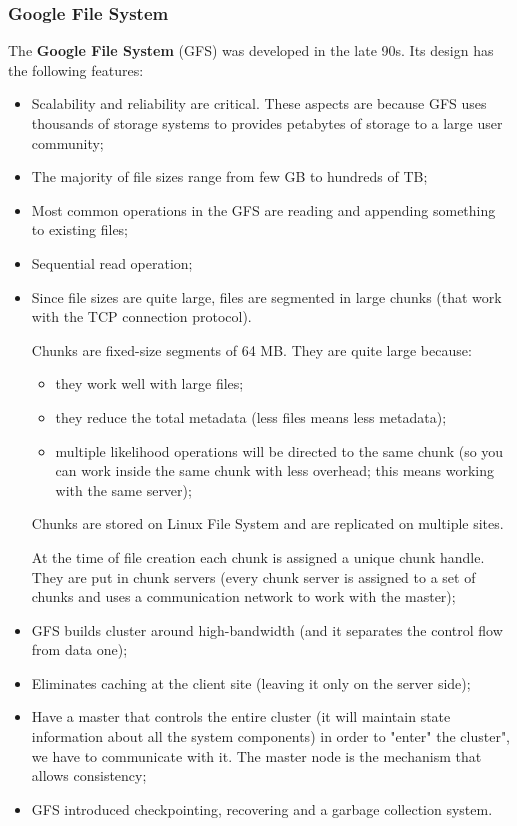 \subsubsection{Google File System}
The \textbf{Google File System} (GFS) was developed in the late 90s.
Its design has the following features:
\begin{itemize}
    \item Scalability and reliability are critical. These aspects are because GFS uses thousands of storage systems to provides petabytes of storage to a large user community;
    \item The majority of file sizes range from few GB to hundreds of TB;
    \item Most common operations in the GFS are reading and appending something to existing files;
    \item Sequential read operation;
    \item Since file sizes are quite large, files are segmented in large chunks (that work with the TCP connection protocol).
    
    Chunks are fixed-size segments of 64 MB. They are quite large because:
    \begin{itemize}
        \item they work well with large files;
        \item they reduce the total metadata (less files means less metadata);
        \item multiple likelihood operations will be directed to the same chunk (so you can work inside the same chunk with less overhead; this means working with the same server);
    \end{itemize}
    Chunks are stored on Linux File System and are replicated on multiple sites.
    
    At the time of file creation each chunk is assigned a unique chunk handle. They are put in chunk servers (every chunk server is assigned to a set of chunks and uses a communication network to work with the master);
    \item GFS builds cluster around high-bandwidth (and it separates the control flow from data one); 
    \item Eliminates caching at the client site (leaving it only on the server side);
    \item Have a master that controls the entire cluster (it will maintain state information about all the system components) in order to "enter" the cluster", we have to communicate with it. The master node is the mechanism that allows consistency;
    \item GFS introduced checkpointing, recovering and a garbage collection system.
\end{itemize}

